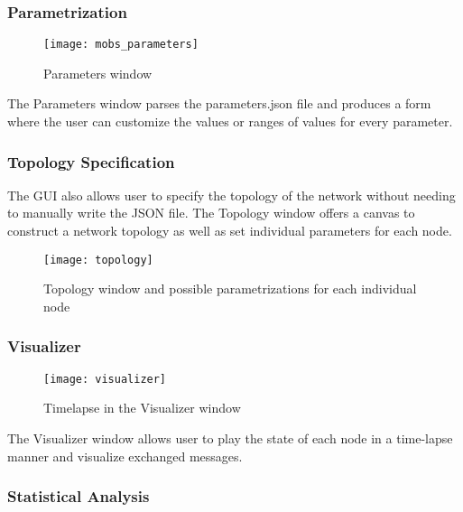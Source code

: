 \subsubsection{Parametrization}
\label{subsubsec:parametrization}

\begin{figure}[h]
	\centering
	\texttt{[image: mobs\_parameters]}
	\caption{Parameters window}
	\label{fig:mobs_parameters}
\end{figure}

The Parameters window parses the parameters.json file and produces a form
where the user can customize the values or ranges of values for every parameter.

\subsubsection{Topology Specification}
\label{subsubsec:topology_specification}

The GUI also allows user to specify the topology of the network without needing
to manually write the JSON file. The Topology window offers a canvas to construct a network
topology as well as set individual parameters for each node.

\begin{figure}[h]
	\centering
	\texttt{[image: topology]}
	\caption{Topology window and possible parametrizations for each individual node}
	\label{fig:topology}
\end{figure}

\subsubsection{Visualizer}
\label{subsubsec:visualizer}

\begin{figure}[h]
	\centering
	\texttt{[image: visualizer]}
	\caption{Timelapse in the Visualizer window}
	\label{fig:visualizer}
\end{figure}

The Visualizer window allows user to play the state of each node in a time-lapse manner
and visualize exchanged messages.

\subsubsection{Statistical Analysis}
\label{subsubsec:statistical_analysis}

